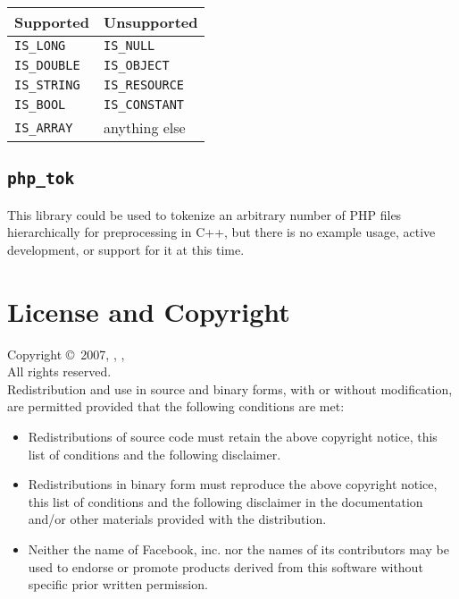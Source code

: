 \documentclass[11pt,titlepage]{article}
\begin{document}
\begin{table}[!h]
\begin{center}
\begin{tabular}{l l}
Supported & Unsupported\\
\hline
\verb|IS_LONG| & \verb|IS_NULL|\\
\verb|IS_DOUBLE| & \verb|IS_OBJECT|\\
\verb|IS_STRING| & \verb|IS_RESOURCE|\\
\verb|IS_BOOL| & \verb|IS_CONSTANT|\\
\verb|IS_ARRAY| & anything else\\
\end{tabular}
\end{center}
\end{table}

\subsection{\texttt{php\_tok}}

This library could be used to tokenize an arbitrary number of PHP files hierarchically for preprocessing in C++, but there is no example usage, active development, or support for it at this time.


\newpage
\section{License and Copyright}

Copyright \copyright\ 2007, , , 
\\
All rights reserved.
\\

Redistribution and use in source and binary forms, with or without modification, are permitted provided that the following conditions are met:

\begin{itemize}

\item Redistributions of source code must retain the above copyright notice, this list of conditions and the following disclaimer.
\item Redistributions in binary form must reproduce the above copyright notice, this list of conditions and the following disclaimer in the documentation and/or other materials provided with the distribution.
\item Neither the name of Facebook, inc. nor the names of its contributors may be used to endorse or promote products derived from this software without specific prior written permission.

\end{itemize}
\end{document}
